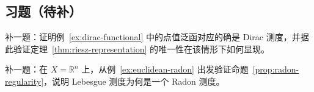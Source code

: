 \subsection*{习题（待补）}

\begin{exercise}\label{exr:dirac-riesz-placeholder}
补一题：证明例~\ref{ex:dirac-functional} 中的点值泛函对应的确是 Dirac 测度，并据此验证定理~\ref{thm:riesz-representation} 的唯一性在该情形下如何显现。
\end{exercise}

\begin{exercise}[有限维桥接题占位]\label{exr:euclidean-riesz-placeholder}
补一题：在 $X=\mathbb R^n$ 上，从例~\ref{ex:euclidean-radon} 出发验证命题~\ref{prop:radon-regularity}，说明 Lebesgue 测度为何是一个 Radon 测度。
\end{exercise}
